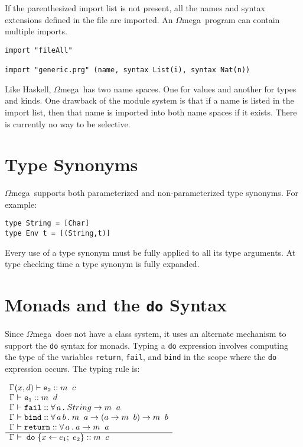 \documentclass[11pt,twoside]{article}
\newcommand{\om}{$\Omega$mega}
\begin{document}
If the parenthesized import list is not present, all the names and syntax
extensions defined in the file are imported.
An \om\ program can contain multiple imports.
\begin{verbatim}
import "fileAll"

import "generic.prg" (name, syntax List(i), syntax Nat(n))
\end{verbatim}

Like Haskell, \om\ has
two name spaces. One for values and another for types and kinds. One drawback
of the module system is that if a name is listed in the import list, then
that name is imported into both name spaces if it exists. There is currently
no way to be selective.


\section{Type Synonyms} \label{syn}
\om\ supports both parameterized  and non-parameterized type synonyms.
For example:
\begin{verbatim}
type String = [Char]
type Env t = [(String,t)]
\end{verbatim}
Every use of a type synonym must be fully applied to all
its type arguments. At type checking time a type synonym
is fully expanded.

\section{Monads and the {\tt do} Syntax} \label{monads}
Since \om\ does not have a class system, it uses an alternate mechanism
to support the {\tt do} syntax for monads. Typing a {\tt do} expression
involves computing the type of the variables {\tt return}, {\tt fail},
and {\tt bind} in the scope where the {\tt do} expression occurs.
The typing rule is:
\vspace*{.1in}

$
\begin{array}{l}
 \Gamma(x,d) \vdash {\tt e_2} :: m\;\; c \\
 \Gamma \vdash {\tt e_1} :: m\;\; d \\
 \Gamma \vdash {\tt fail} ::  \forall\, a\, .\;String \rightarrow m\;\; a\\
 \Gamma \vdash {\tt bind} :: \forall\, a\, b\, .\; m\;\;a \rightarrow (a \rightarrow m\;\; b) \rightarrow m\;\; b\\
 \Gamma \vdash {\tt return} :: \forall\, a\, .\; a \rightarrow m\;\; a \\ \hline
 \Gamma \vdash \;{\tt do}\; \{ x  \leftarrow e_1; \; e_2 \} :: m\;\;c \
 \end{array}
$
\end{document}
